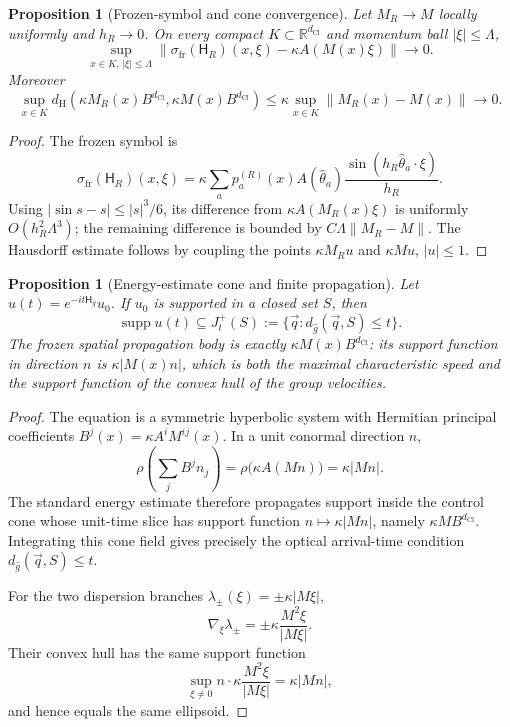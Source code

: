 \documentclass[11pt]{article}
\newtheorem{proposition}[theorem]{Proposition}
\theoremstyle{definition}
\theoremstyle{remark}
\newcommand{\R}{\mathbb{R}}
\newcommand{\dCl}{d_{\mathrm{Cl}}}
\newcommand{\supp}{\operatorname{supp}}
\newcommand{\Ham}{\mathsf{H}}
\newcommand{\norm}[1]{\lVert#1\rVert}
\begin{document}
\begin{proposition}[Frozen-symbol and cone convergence]
\label{prop:joint-symbol-cone}
Let \(M_R\to M\) locally uniformly and \(h_R\to0\).  On every compact
\(K\subset\R^{\dCl}\) and momentum ball \(|\xi|\le\Lambda\),
\[
 \sup_{x\in K,\,|\xi|\le\Lambda}
 \norm{\sigma_{\mathrm{fr}}(\Ham_R)(x,\xi)-\kappa A(M(x)\xi)}
 \longrightarrow0.
\]
Moreover
\[
 \sup_{x\in K}
 d_{\mathrm H}\!\left(\kappa M_R(x)B^{\dCl},
                       \kappa M(x)B^{\dCl}\right)
 \le \kappa\sup_{x\in K}\norm{M_R(x)-M(x)}
 \longrightarrow0.
\]
\end{proposition}

\begin{proof}
The frozen symbol is
\[
 \sigma_{\mathrm{fr}}(\Ham_R)(x,\xi)
 =\kappa\sum_a p_a^{(R)}(x)A(\hat\theta_a)
   \frac{\sin(h_R\hat\theta_a\cdot\xi)}{h_R}.
\]
Using \(|\sin s-s|\le |s|^3/6\), its difference from
\(\kappa A(M_R(x)\xi)\) is uniformly \(O(h_R^2\Lambda^3)\); the remaining
difference is bounded by
\(C\Lambda\norm{M_R-M}\).  The Hausdorff estimate follows by coupling the points
\(\kappa M_Ru\) and \(\kappa Mu\), \(|u|\le1\).
\end{proof}

\begin{proposition}[Energy-estimate cone and finite propagation]
\label{prop:joint-finite-propagation}
Let \(u(t)=e^{-it\Ham_g}u_0\).  If \(u_0\) is supported in a closed set \(S\),
then
\[
 \supp u(t)\subseteq
 J_t^+(S):=\{\vec q:d_{\widehat g}(\vec q,S)\le t\}.
\]
The frozen spatial propagation body is exactly
\(\kappa M(x)B^{\dCl}\): its support function in direction \(n\) is
\(\kappa|M(x)n|\), which is both the maximal characteristic speed and the
support function of the convex hull of the group velocities.
\end{proposition}

\begin{proof}
The equation is a symmetric hyperbolic system with Hermitian principal
coefficients
\(B^j(x)=\kappa A^iM^{ij}(x)\).  In a unit conormal direction \(n\),
\[
 \rho\!\left(\sum_j B^jn_j\right)
 =\rho\bigl(\kappa A(Mn)\bigr)=\kappa|Mn|.
\]
The standard energy estimate therefore propagates support inside the control
cone whose unit-time slice has support function \(n\mapsto\kappa|Mn|\), namely
\(\kappa MB^{\dCl}\).  Integrating this cone field gives precisely the optical
arrival-time condition \(d_{\widehat g}(\vec q,S)\le t\).

For the two dispersion branches
\(\lambda_\pm(\xi)=\pm\kappa|M\xi|\),
\[
 \nabla_\xi\lambda_\pm
 =\pm\kappa\frac{M^2\xi}{|M\xi|}.
\]
Their convex hull has the same support function
\[
 \sup_{\xi\ne0}
 n\cdot\kappa\frac{M^2\xi}{|M\xi|}
 =\kappa|Mn|,
\]
and hence equals the same ellipsoid.
\end{proof}
\end{document}
